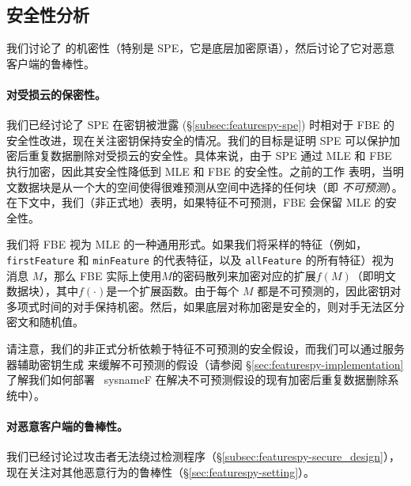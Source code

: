 \subsection{安全性分析}
\label{subsec:featurespy-security}
我们讨论了 \sysnameF 的机密性（特别是 SPE，它是底层加密原语），然后讨论了它对恶意客户端的鲁棒性。

\paragraph*{对受损云的保密性。}
我们已经讨论了 SPE 在密钥被泄露 (\S\ref{subsec:featurespy-spe}) 时相对于 FBE 的安全性改进，现在关注密钥保持安全的情况。我们的目标是证明 SPE 可以保护加密后重复数据删除对受损云的安全性。具体来说，由于 SPE 通过 MLE 和 FBE 执行加密，因此其安全性降低到 MLE 和 FBE 的安全性。之前的工作 \cite{bellare2013MLE} 表明，当明文数据块是从一个大的空间使得很难预测从空间中选择的任何块（即 {\em 不可预测}）。在下文中，我们（非正式地）表明，如果特征不可预测，FBE 会保留 MLE 的安全性。


我们将 FBE 视为 MLE 的一种通用形式。如果我们将采样的特征（例如，{\tt firstFeature} 和 {\tt minFeature} 的代表特征，以及 {\tt allFeature} 的所有特征）视为消息 $M$，那么 FBE 实际上使用$M$的密码散列来加密对应的扩展$f(M)$（即明文数据块），其中$f(\cdot)$是一个扩展函数。由于每个 $M$ 都是不可预测的，因此密钥对多项式时间的对手保持机密。然后，如果底层对称加密是安全的，则对手无法区分密文和随机值。

请注意，我们的非正式分析依赖于特征不可预测的安全假设，而我们可以通过服务器辅助密钥生成 \cite{bellare2013DupLESS} 来缓解不可预测的假设（请参阅 \S\ref{sec:featurespy-implementation} 了解我们如何部署 \ sysnameF 在解决不可预测假设的现有加密后重复数据删除系统中）。


\paragraph*{对恶意客户端的鲁棒性。}
我们已经讨论过攻击者无法绕过检测程序（\S\ref{subsec:featurespy-secure_design}），现在关注对其他恶意行为的鲁棒性（\S\ref{sec:featurespy-setting}）。


